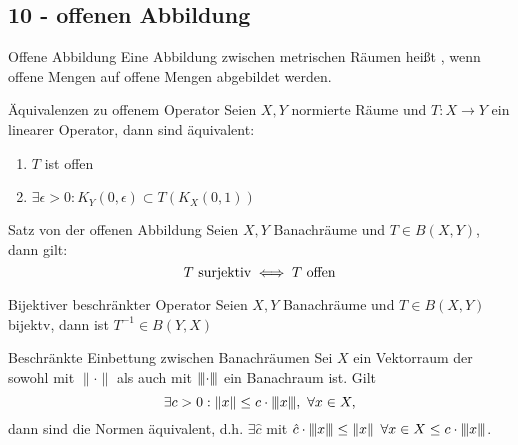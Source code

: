 \subsection*{10 - offenen Abbildung}

	\begin{karte}{Offene Abbildung}
			Eine Abbildung zwischen metrischen Räumen heißt , wenn offene Mengen auf offene Mengen abgebildet werden.
	\end{karte}
	
	\begin{karte}{Äquivalenzen zu offenem Operator}
				Seien $X, Y$ normierte Räume und $T: X \rightarrow Y$ ein linearer Operator, dann sind äquivalent:
		\begin{enumerate}[label=\alph*\upshape)]
			\item $T$ ist offen
			\item $\exists \epsilon > 0: K_{Y}(0, \epsilon) \subset T(K_{X}(0, 1))$
		\end{enumerate}
	\end{karte}
	
	\begin{karte}{Satz von der offenen Abbildung}
		Seien $X, Y$ Banachräume und $T \in B(X, Y)$, dann gilt:
		\[ T \text{ surjektiv} \iff T \text{ offen} \]
	\end{karte}

	\begin{karte}{Bijektiver beschränkter Operator}	
		Seien $X, Y$ Banachräume und $T \in B(X, Y)$ bijektv, dann ist $T^{-1} \in B(Y, X)$	
	\end{karte}

	\begin{karte}{Beschränkte Einbettung zwischen Banachräumen}	
		Sei $X$	ein Vektorraum der sowohl mit $\| \cdot \|$ als auch mit ${\left\vert\kern-0.25ex\left\vert\kern-0.25ex\left\vert\cdot\right\vert\kern-0.25ex\right\vert\kern-0.25ex\right\vert}$ ein Banachraum ist. Gilt 
		\[ \exists c > 0: \| x \| \leq c \cdot {\left\vert\kern-0.25ex\left\vert\kern-0.25ex\left\vert x\right\vert\kern-0.25ex\right\vert\kern-0.25ex\right\vert}, ~ \forall x \in X, \]
		dann sind die Normen äquivalent, d.h. $\exists \hat{c} $ mit $\hat{c} \cdot {\left\vert\kern-0.25ex\left\vert\kern-0.25ex\left\vert x\right\vert\kern-0.25ex\right\vert\kern-0.25ex\right\vert} \leq \| x \|$ $\forall x \in X \leq c \cdot {\left\vert\kern-0.25ex\left\vert\kern-0.25ex\left\vert x\right\vert\kern-0.25ex\right\vert\kern-0.25ex\right\vert}$. 
	\end{karte}